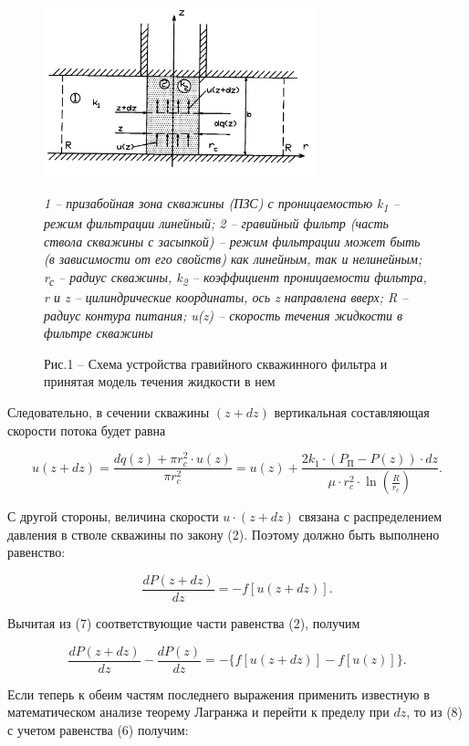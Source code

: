 \begin{figure}[H]
	\centering
	\includegraphics[width=0.7\textwidth]{media/gorn/image17}
	\caption*{\normalfont\emph{1 -- призабойная зона скважины (ПЗС) с проницаемостью
k\textsubscript{1} -- режим фильтрации линейный; 2 -- гравийный фильтр
(часть ствола скважины с засыпкой) -- режим фильтрации может быть (в
зависимости от его свойств) как линейным, так и нелинейным;
r\textsubscript{с} -- радиус скважины, k\textsubscript{2} -- коэффициент
проницаемости фильтра, r и z -- цилиндрические координаты, ось z
направлена вверх; R -- радиус контура питания; u(z) -- скорость течения
жидкости в фильтре скважины}}
	\caption*{Рис.1 -- Схема устройства гравийного скважинного фильтра и принятая модель течения жидкости в нем}
\end{figure}

Следовательно, в сечении скважины $(z+dz)$ вертикальная
составляющая скорости потока будет равна

\begin{equation}
u(z+dz)=\frac{dq(z)+\pi r_c^2\cdot u(z)}{\pi r_c^2}=u(z)+\frac{2k_1\cdot (P_{\text{П}}-P(z))\cdot dz}{\mu\cdot r_c^2\cdot \ln\left(\frac{R}{r_c}\right)}.
\end{equation}

С другой стороны, величина скорости $u\cdot(z+dz)$ связана с
распределением давления в стволе скважины по закону (2). Поэтому должно
быть выполнено равенство:

\begin{equation}
\frac{dP(z+dz)}{dz}=-f[u(z+dz)].
\end{equation}

Вычитая из (7) соответствующие части равенства (2), получим

\begin{equation}
\frac{dP(z+dz)}{dz}-\frac{dP(z)}{dz}=-\{f[u(z+dz)]-f[u(z)]\}.
\end{equation}

Если теперь к обеим частям последнего выражения применить известную в
математическом анализе теорему Лагранжа и перейти к пределу при
$dz$, то из (8) с учетом равенства (6) получим:

